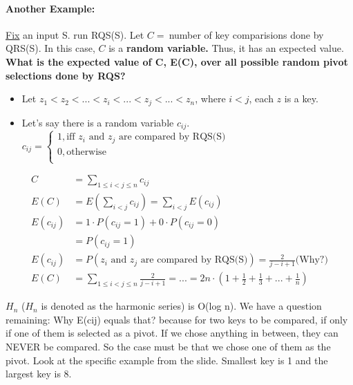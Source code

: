 \documentclass{article}
\begin{document}
\paragraph{Another Example: } \uline{Fix} an input S. run RQS(S). Let $C =\ $number of key comparisions done by QRS(S). In this case, $C$ is a \textbf{random variable.} Thus, it has an expected value. \textbf{What is the expected value of C, E(C), over all possible random pivot selections done by RQS?}\\
\begin{itemize}
\item 
Let $z_1 < z_2 <...<z_i<...<z_j<...<z_n$, where $i < j$, each $z$ is a key.
\item
Let's say there is a random variable $c_{ij}$. 
$c_{ij} = \begin{cases}
1, \text{iff $z_i$ and $z_j$ are compared by RQS(S)}\\
0, \text{otherwise}\\
\end{cases}
$
\end{itemize}
\begin{align}
C &= \sum_{1 \leq i < j \leq n}c_{ij}\\
E(C) &= E(\sum_{i < j} c_{ij}) = \sum_{i < j} E(c_{ij})\\
E(c_{ij}) &= 1 \cdot P(c_{ij} = 1) + 0 \cdot P(c_{ij} = 0)\\
&= P(c_{ij} = 1)\\
E(c_{ij}) &= P(\text{$z_i$ and $z_j$ are compared by RQS(S)}) = \frac{2}{j - i +1} \text{(Why?)}\\
E(C) &=\sum_{1 \leq i < j \leq n} \frac{2}{j - i + 1} = ... = {2n \cdot (1 + \frac{1}{2} + \frac{1}{3}  + ... +\frac{1}{n})} 
\end{align}

$H_n$ ($H_n$ is denoted as the harmonic series) is O(log n). We have a question remaining:
Why E(cij) equals that? because for two keys to be compared, if only if one of them is selected as a pivot. If we chose anything in between, they can NEVER be compared. So the case must be that we chose one of them as the pivot. Look at the specific example from the slide. Smallest key is 1 and the largest key is 8. 
\end{document}
